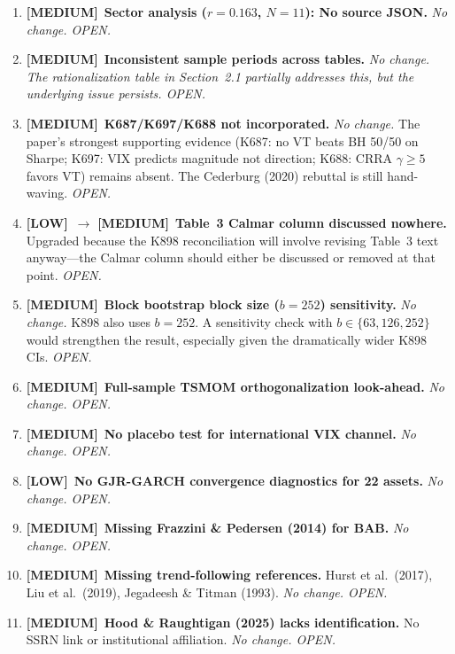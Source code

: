 \documentclass[12pt,a4paper]{article}
\newcommand{\MEDIUM}{\textcolor{medsev}{\textbf{[MEDIUM]}}}
\newcommand{\LOW}{\textcolor{lowsev}{\textbf{[LOW]}}}
\begin{document}
\begin{enumerate}[label=\textbf{M\arabic*}., start=1]

\item \MEDIUM\ \textbf{Sector analysis ($r = 0.163$, $N = 11$): No source JSON.} \textit{No change. OPEN.}

\item \MEDIUM\ \textbf{Inconsistent sample periods across tables.} \textit{No change. The rationalization table in Section~2.1 partially addresses this, but the underlying issue persists. OPEN.}

\item \MEDIUM\ \textbf{K687/K697/K688 not incorporated.} \textit{No change.} The paper's strongest supporting evidence (K687: no VT beats BH 50/50 on Sharpe; K697: VIX predicts magnitude not direction; K688: CRRA $\gamma \geq 5$ favors VT) remains absent. The Cederburg (2020) rebuttal is still hand-waving. \textit{OPEN.}

\item \LOW\ $\to$ \MEDIUM\ \textbf{Table~3 Calmar column discussed nowhere.} Upgraded because the K898 reconciliation will involve revising Table~3 text anyway---the Calmar column should either be discussed or removed at that point. \textit{OPEN.}

\item \MEDIUM\ \textbf{Block bootstrap block size ($b = 252$) sensitivity.} \textit{No change.} K898 also uses $b = 252$. A sensitivity check with $b \in \{63, 126, 252\}$ would strengthen the result, especially given the dramatically wider K898 CIs. \textit{OPEN.}

\item \MEDIUM\ \textbf{Full-sample TSMOM orthogonalization look-ahead.} \textit{No change. OPEN.}

\item \MEDIUM\ \textbf{No placebo test for international VIX channel.} \textit{No change. OPEN.}

\item \LOW\ \textbf{No GJR-GARCH convergence diagnostics for 22 assets.} \textit{No change. OPEN.}

\item \MEDIUM\ \textbf{Missing Frazzini \& Pedersen (2014) for BAB.} \textit{No change. OPEN.}

\item \MEDIUM\ \textbf{Missing trend-following references.} Hurst et al.\ (2017), Liu et al.\ (2019), Jegadeesh \& Titman (1993). \textit{No change. OPEN.}

\item \MEDIUM\ \textbf{Hood \& Raughtigan (2025) lacks identification.} No SSRN link or institutional affiliation. \textit{No change. OPEN.}

\end{enumerate}
\end{document}
